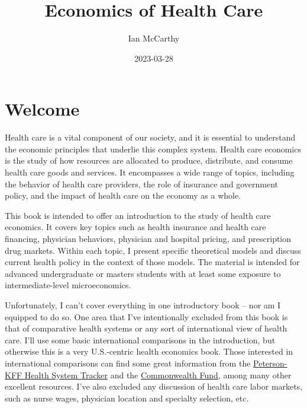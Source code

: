 \documentclass[
  letterpaper,
  DIV=11,
  numbers=noendperiod]{scrreport}
\title{Economics of Health Care}
\author{Ian McCarthy}
\date{2023-03-28}
\renewcommand*\contentsname{Table of contents}
\newcommand\contentsname{Table of contents}
\theoremstyle{definition}
\theoremstyle{remark}
\begin{document}
\maketitle
\ifdefined\Shaded\renewenvironment{Shaded}{\begin{tcolorbox}[enhanced, interior hidden, boxrule=0pt, breakable, frame hidden, sharp corners, borderline west={3pt}{0pt}{shadecolor}]}{\end{tcolorbox}}\fi

\renewcommand*\contentsname{Table of contents}
{
\hypersetup{linkcolor=}
\setcounter{tocdepth}{2}
\tableofcontents
}

\hypertarget{welcome}{%
\chapter*{Welcome}\label{welcome}}


Health care is a vital component of our society, and it is essential to
understand the economic principles that underlie this complex system.
Health care economics is the study of how resources are allocated to
produce, distribute, and consume health care goods and services. It
encompasses a wide range of topics, including the behavior of health
care providers, the role of insurance and government policy, and the
impact of health care on the economy as a whole.

This book is intended to offer an introduction to the study of health
care economics. It covers key topics such as health insurance and health
care financing, physician behaviors, physician and hospital pricing, and
prescription drug markets. Within each topic, I present specific
theoretical models and discuss current health policy in the context of
those models. The material is intended for advanced undergraduate or
masters students with at least some exposure to intermediate-level
microeconomics.

Unfortunately, I can't cover everything in one introductory book -- nor
am I equipped to do so. One area that I've intentionally excluded from
this book is that of comparative health systems or any sort of
international view of health care. I'll use some basic international
comparisons in the introduction, but otherwise this is a very
U.S.-centric health economics book. Those interested in international
comparisons can find some great information from the
\href{https://www.healthsystemtracker.org/}{Peterson-KFF Health System
Tracker} and the
\href{https://www.commonwealthfund.org/international-health-policy-center/system-profiles}{Commonwealth
Fund}, among many other excellent resources. I've also excluded any
discussion of health care labor markets, such as nurse wages, physician
location and specialty selection, etc.
\end{document}
